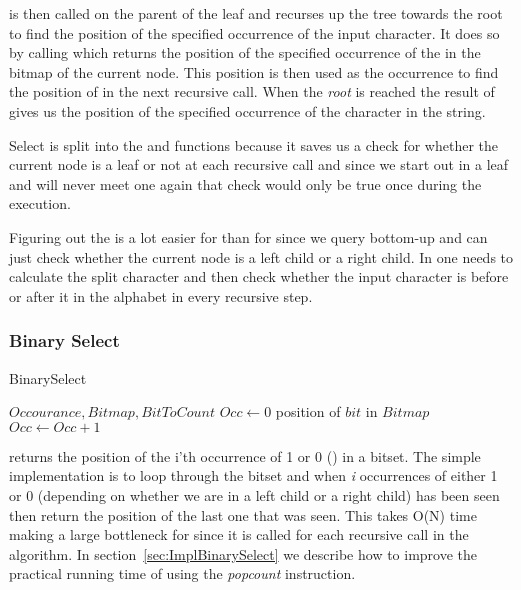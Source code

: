 is then called on the parent of the leaf and recurses up the tree towards the root to find the position of the specified occurrence of the input character.
It does so by calling  which returns the position of the specified occurrence of the  in the bitmap of the current node. 
This position is then used as the occurrence to find the position of in the next recursive call.
When the \textit{root} is reached the result of  gives us the position of the specified occurrence of the character in the string.

Select is split into the  and  functions because it saves us a check for whether the current node is a leaf or not at each recursive call and since we start out in a leaf and will never meet one again that check would only be true once during the execution.

Figuring out the  is a lot easier for  than for  since we query bottom-up and can just check whether the current node is a left child or a right child. 
In  one needs to calculate the split character and then check whether the input character is before or after it in the alphabet in every recursive step.

\subsubsection{Binary Select}
\begin{algorithm}
\caption{BinarySelect}
\label{alg:binaryselect}
\begin{algorithmic}
 {$Occourance, Bitmap, BitToCount$}
\State $Occ \gets 0$
\State \Return position of $bit$ in $Bitmap$
\EndIf
\State $Occ \gets Occ + 1$
\EndIf
\EndFor
\EndFunction
\end{algorithmic}
\end{algorithm}

 returns the position of the i'th occurrence of 1 or 0 () in a bitset. 
The simple implementation is to loop through the bitset and when \textit{i} occurrences of either 1 or 0 (depending on whether we are in a left child or a right child) has been seen then return the position of the last one that was seen.
This takes O(N) time making  a large bottleneck for  since it is called for each recursive call in the  algorithm.
In section~\ref{sec:ImplBinarySelect} we describe how to improve the practical running time of  using the \textit{popcount} instruction.

